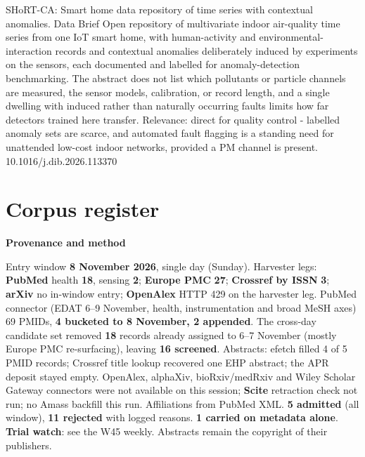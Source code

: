 \documentclass[10pt]{article}
\begin{document}
{SHoRT-CA: Smart home data repository of time series with contextual anomalies.}
{Data Brief}
{Open repository of multivariate indoor air-quality time series from one IoT smart home, with human-activity and environmental-interaction records and contextual anomalies deliberately induced by experiments on the sensors, each documented and labelled for anomaly-detection benchmarking. The abstract does not list which pollutants or particle channels are measured, the sensor models, calibration, or record length, and a single dwelling with induced rather than naturally occurring faults limits how far detectors trained here transfer. Relevance: direct for quality control - labelled anomaly sets are scarce, and automated fault flagging is a standing need for unattended low-cost indoor networks, provided a PM channel is present.}
{10.1016/j.dib.2026.113370}

\clearpage
\section*{\sffamily\bfseries\color{Deep}Corpus register}
\vspace{-1.5mm}{\color{Amber}\rule{\linewidth}{1.1pt}}\vspace{2.5mm}



\vspace{2mm}

\begin{keybox}
{\sffamily\bfseries\footnotesize\color{Deep}Provenance and method}\\[1.2mm]
{\fontsize{7.2}{8.8}\selectfont
Entry window \textbf{8 November 2026}, single day (Sunday). Harvester legs: \textbf{PubMed} health \textbf{18}, sensing \textbf{2}; \textbf{Europe PMC} \textbf{27}; \textbf{Crossref by ISSN} \textbf{3}; \textbf{arXiv} no in-window entry; \textbf{OpenAlex} HTTP 429 on the harvester leg. PubMed connector (EDAT 6--9 November, health, instrumentation and broad MeSH axes) 69 PMIDs, \textbf{4 bucketed to 8 November, 2 appended}. The cross-day candidate set removed \textbf{18} records already assigned to 6--7 November (mostly Europe PMC re-surfacing), leaving \textbf{16 screened}. Abstracts: efetch filled 4 of 5 PMID records; Crossref title lookup recovered one EHP abstract; the APR deposit stayed empty.
OpenAlex, alphaXiv, bioRxiv/medRxiv and Wiley Scholar Gateway connectors were not available on this session; \textbf{Scite} retraction check not run; no Amass backfill this run. Affiliations from PubMed XML.
\textbf{5 admitted} (all window), \textbf{11 rejected} with logged reasons. \textbf{1 carried on metadata alone}. \textbf{Trial watch}: see the W45 weekly.
Abstracts remain the copyright of their publishers.\par}
\end{keybox}
\end{document}
